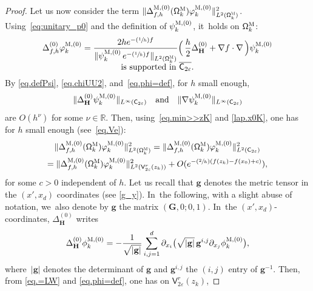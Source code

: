 \documentclass[JEP,XML,SOM,Unicode,NoEqCountersInSection,NoFloatCountersInSection,published]{cedram}
\newcommand{\Psfrac}[2]{(\sfrac{#1}{#2})}
\newcommand{\quand}{\quad\text{and}\quad}
\newcommand{\mbf}[1]{\mathbf{#1}}
\let\ve\varepsilon
\theoremstyle{plain}
\theoremstyle{definition}
\begin{document}
\begin{proof}
Let us now consider the term $\Vert \Delta_{f,h}^{\textsc{M}, (0)}(\mathsf \Omega_k^{\textsc{M}})\varphi^{\textsc{M},(0)}_k \Vert_{L^2(\mathsf \Omega_k^{\textsc{M}})}^2$. Using~\eqref{eq:unitary_p0} and the definition of $\psi^{\textsc{M},(0)}_k$, it~holds on $\mathsf \Omega_k^{\textsc{M}}$:\vspace*{-3pt}
\begin{multline}
\label{eq.=LW}
\Delta_{f,h}^{(0)}\varphi^{\textsc{M},(0)}_k= \frac{2h e^{-\Psfrac 1hf} }{\Vert \psi^{\textsc{M},(0)}_k\, e^{-\Psfrac 1hf} \Vert_{L^2(\mathsf \Omega_k^{\textsc{M}})}}\Bigl(\, \frac h2 \Delta_{\mbf H}^{(0)}+\nabla f\cdot \nabla \, \Bigr)\psi^{\textsc{M},(0)}_k \\[-5pt] \text{is supported in $\overline{\mathsf C_{2\ve}}$.}
\end{multline}
By \eqref{eq.defPsi}, \eqref{eq.chiUU2}, and~\eqref{eq.phi=def}, for
$h$ small enough,\vspace*{-3pt}
\[
\Vert \Delta_{\mbf H}^{(0)}
\psi^{\textsc{M},(0)}_k\Vert_{L^\infty(\mathsf C_{2\ve})}\quand\Vert \nabla\psi^{\textsc{M},(0)}_k \Vert_{L^\infty(\mathsf C_{2\ve})}
\]
are $O(h^\nu)$ for some $\nu\in \mathbb R$.
Then, using~\eqref{eq.min>>zK} and \eqref{lap.x0K}, one has for $h$ small enough (see~\eqref{eq.Ve}):\vspace*{-3pt}
\begin{multline}
\label{eq.NeG}
\Vert \Delta_{f,h}^{\textsc{M}, (0)}(\mathsf \Omega_k^{\textsc{M}})\varphi^{\textsc{M},(0)}_k \Vert_{L^2(\mathsf \Omega_k^{\textsc{M}})}^2 =\Vert \Delta_{f,h}^{\textsc{M}, (0)}(\mathsf \Omega_k^{\textsc{M}})\varphi^{\textsc{M},(0)}_k \Vert_{L^2(\mathsf C_{2\ve})}^2\\
= \Vert \Delta_{f,h}^{\textsc{M}, (0)}(\mathsf \Omega_k^{\textsc{M}})\varphi^{\textsc{M},(0)}_k\Vert_{L^2(\mathsf V_{2\ve}^r(z_k))}^2 +O(e^{-\Psfrac 2h (f(z_k)-f(x_0)+c)}),
\end{multline}
for some $c>0$ independent of $h$. Let us recall that $\mbf g$ denotes
the metric tensor in the $(x',x_d)$ coordinates (see \eqref{g_y}). In~the following, with a slight abuse of notation, we~also denote by
$\mbf g$ the matrix $(\mbf G, 0;0, 1)$. In~the $(x',x_d)$-coordinates, $\Delta_{\mbf H}^{(0)}$ writes
\[
\Delta_{\mbf H}^{(0)} \phi^{\textsc{M},(0)}_k=-\frac{1}{\sqrt{\vert \mbf g\vert}}\sum_{i,j=1}^d \partial_{x_i}\bigl(\sqrt{\vert \mbf g\vert} \, \mbf g^{i,j} \partial_{x_j}\phi^{\textsc{M},(0)}_k \bigr),
\]
where~$\vert \mbf g\vert$ denotes the determinant of $ \mbf g$ and $\mbf g^{i,j} $ the $(i,j)$ entry of $ \mbf g^{-1}$.
Then, from \eqref{eq.=LW} and \eqref{eq.phi=def}, one has on $\mathsf V_{2\ve}^r(z_k)$,

\end{proof}
\end{document}
